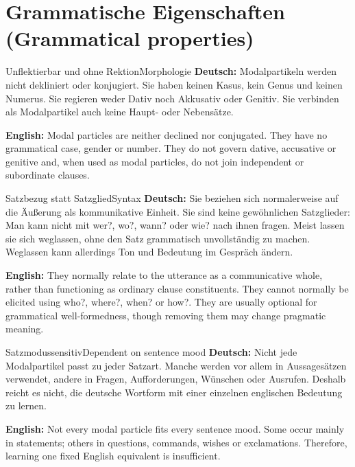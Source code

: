\documentclass[a4paper,11pt]{article}
\newcommand{\GermanText}[1]{\textbf{Deutsch: }#1\par}
\newcommand{\EnglishText}[1]{{\small\color{SoftGray}\textbf{English: }#1\par}}
\begin{document}
\section{Grammatische Eigenschaften \textnormal{(Grammatical properties)}}
\begin{grammarentry}{Unflektierbar und ohne Rektion}{Morphologie}
\GermanText{Modalpartikeln werden nicht dekliniert oder konjugiert. Sie haben keinen Kasus, kein Genus und keinen Numerus. Sie regieren weder Dativ noch Akkusativ oder Genitiv. Sie verbinden als Modalpartikel auch keine Haupt- oder Nebensätze.}
\EnglishText{Modal particles are neither declined nor conjugated. They have no grammatical case, gender or number. They do not govern dative, accusative or genitive and, when used as modal particles, do not join independent or subordinate clauses.}
\end{grammarentry}
\begin{grammarentry}{Satzbezug statt Satzglied}{Syntax}
\GermanText{Sie beziehen sich normalerweise auf die Äußerung als kommunikative Einheit. Sie sind keine gewöhnlichen Satzglieder: Man kann nicht mit wer?, wo?, wann? oder wie? nach ihnen fragen. Meist lassen sie sich weglassen, ohne den Satz grammatisch unvollständig zu machen. Weglassen kann allerdings Ton und Bedeutung im Gespräch ändern.}
\EnglishText{They normally relate to the utterance as a communicative whole, rather than functioning as ordinary clause constituents. They cannot normally be elicited using who?, where?, when? or how?. They are usually optional for grammatical well-formedness, though removing them may change pragmatic meaning.}
\end{grammarentry}
\begin{grammarentry}{Satzmodussensitiv}{Dependent on sentence mood}
\GermanText{Nicht jede Modalpartikel passt zu jeder Satzart. Manche werden vor allem in Aussagesätzen verwendet, andere in Fragen, Aufforderungen, Wünschen oder Ausrufen. Deshalb reicht es nicht, die deutsche Wortform mit einer einzelnen englischen Bedeutung zu lernen.}
\EnglishText{Not every modal particle fits every sentence mood. Some occur mainly in statements; others in questions, commands, wishes or exclamations. Therefore, learning one fixed English equivalent is insufficient.}
\end{grammarentry}
\end{document}
